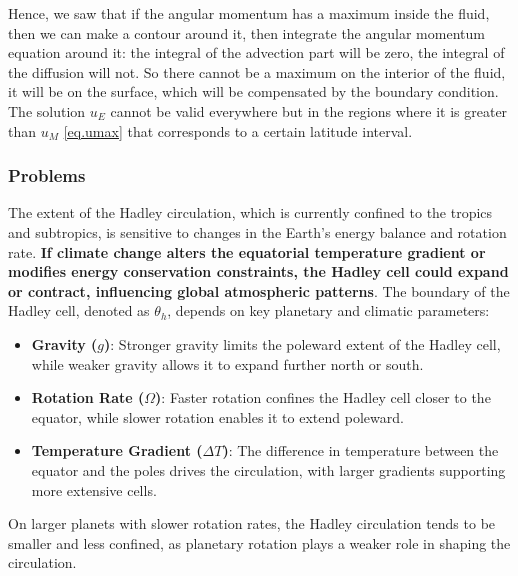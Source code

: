 Hence, we saw that if the angular momentum has a maximum inside the fluid, then we can make a contour around it, then integrate the angular momentum equation around it: the integral of the advection part will be zero, the integral of the diffusion will not. So there cannot be a maximum on the interior of the fluid, it will be on the surface, which will be compensated by the boundary condition. The solution $u_E$ cannot be valid everywhere but in the regions where it is greater than $u_M$ \ref{eq.umax} that corresponds to a certain latitude interval.

\subsubsection{Problems}
The extent of the Hadley circulation, which is currently confined to the tropics and subtropics, is sensitive to changes in the Earth's energy balance and rotation rate. \textbf{If climate change alters the equatorial temperature gradient or modifies energy conservation constraints, the Hadley cell could expand or contract, influencing global atmospheric patterns}.
The boundary of the Hadley cell, denoted as $\theta_h$, depends on key planetary and climatic parameters:

\begin{itemize}
    \item \textbf{Gravity ($g$)}: Stronger gravity limits the poleward extent of the Hadley cell, while weaker gravity allows it to expand further north or south.
    \item \textbf{Rotation Rate ($\Omega$)}: Faster rotation confines the Hadley cell closer to the equator, while slower rotation enables it to extend poleward.
    \item \textbf{Temperature Gradient ($\Delta T$)}: The difference in temperature between the equator and the poles drives the circulation, with larger gradients supporting more extensive cells.
\end{itemize}
On larger planets with slower rotation rates, the Hadley circulation tends to be smaller and less confined, as planetary rotation plays a weaker role in shaping the circulation.\\
[0.25cm]

